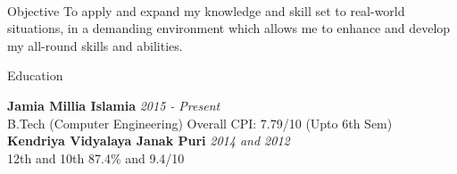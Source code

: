 \documentclass{resume} %
\begin{document}
	\\


\begin{rSection}{Objective}
To apply and expand my knowledge and skill set to real-world situations, in a demanding environment which allows me to enhance and develop my all-round skills and abilities.
\end{rSection}


\begin{rSection}{Education}

{\bf Jamia Millia Islamia} \hfill {\em 2015 - Present} 
\\ B.Tech (Computer Engineering) \hfill { Overall CPI: 7.79/10 (Upto 6th Sem)} 
\\{\bf Kendriya Vidyalaya Janak Puri} \hfill {\em 2014 and 2012} \\
12th and 10th \hfill {87.4\% and 9.4/10}


\end{rSection}
\end{document}
